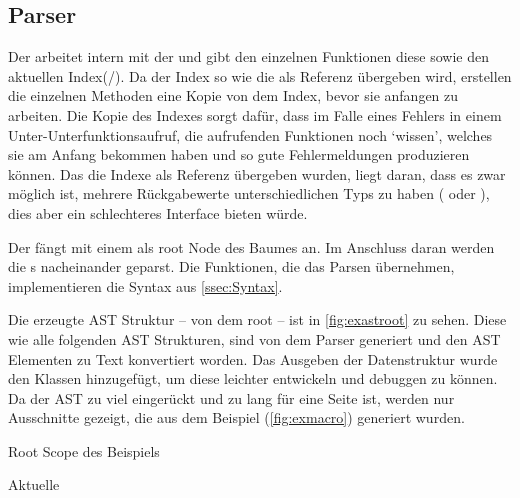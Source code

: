   \subsection{Parser}
  \label{ssec:Parser}
    Der  arbeitet intern mit der  und gibt den einzelnen Funktionen diese sowie den aktuellen Index(/). Da der Index so wie die  als Referenz übergeben wird, erstellen die einzelnen Methoden eine Kopie von dem Index, bevor sie anfangen zu arbeiten. Die Kopie des Indexes sorgt dafür, dass im Falle eines Fehlers in einem Unter-Unterfunktionsaufruf, die aufrufenden Funktionen noch `wissen', welches  sie am Anfang bekommen haben und so gute Fehlermeldungen produzieren können. Das die Indexe als Referenz übergeben wurden, liegt daran, dass es zwar möglich ist, mehrere Rückgabewerte unterschiedlichen Typs zu haben ( oder ), dies aber ein schlechteres Interface bieten würde.

    Der  fängt mit einem  als root Node des Baumes an. Im Anschluss daran werden die s nacheinander geparst. Die Funktionen, die das Parsen übernehmen, implementieren die Syntax aus \autoref{ssec:Syntax}.

    Die erzeugte AST Struktur -- von dem root  -- ist in \autoref{fig:exastroot} zu sehen. Diese wie alle folgenden AST Strukturen, sind von dem Parser generiert und den AST Elementen zu Text konvertiert worden. Das Ausgeben der Datenstruktur wurde den  Klassen hinzugefügt, um diese leichter entwickeln und debuggen zu können. Da der AST zu viel eingerückt und zu lang für eine Seite ist, werden nur Ausschnitte gezeigt, die aus dem Beispiel (\autoref{fig:exmacro}) generiert wurden.
    \begin{paracol}{2}
      \begin{myCodeEnv}
        \centering
        \begin{myInvBox}[width=.9\linewidth]
          
        \end{myInvBox}
        \caption{Root Scope des Beispiels}
        \label{fig:exastroot}
      \end{myCodeEnv}
      \switchcolumn
      \begin{myCodeEnv}
        \centering
        \begin{myInvBox}[width=.9\linewidth]
          
        \end{myInvBox}
        \caption*{Aktuelle }
      \end{myCodeEnv}
    \end{paracol}

